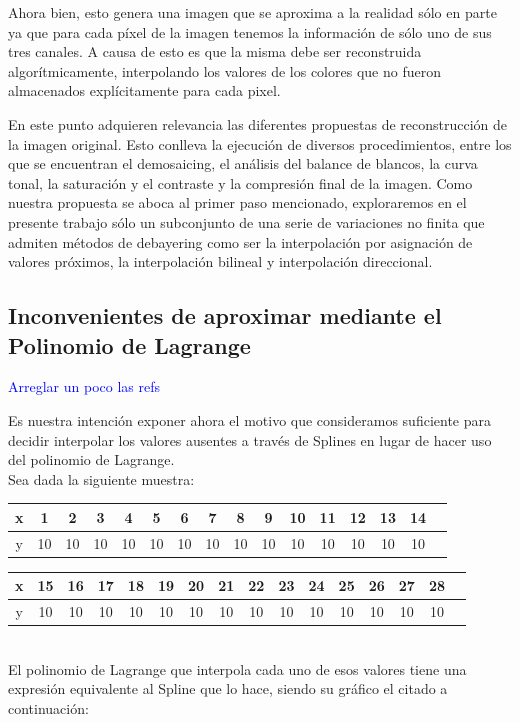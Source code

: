 \documentclass[a4paper]{article}
\begin{document}

Ahora bien, esto genera una imagen que se aproxima a la realidad sólo en parte ya que para cada p\'ixel de la imagen tenemos la informaci\'on de s\'olo uno de sus tres canales. A causa de esto es que la misma debe ser reconstruida algorítmicamente, interpolando los valores de los colores que no fueron almacenados explícitamente para cada pixel.


En este punto adquieren relevancia las diferentes propuestas de reconstrucción de la imagen original. Esto conlleva la ejecución de diversos procedimientos, entre los que se encuentran el demosaicing, el análisis del balance de blancos, la curva tonal, la saturación y el contraste y la compresión final de la imagen. Como nuestra propuesta se aboca al primer paso mencionado, exploraremos en el presente trabajo sólo un subconjunto de una serie de variaciones no finita que admiten métodos de debayering como ser la interpolación por asignación de valores próximos, la interpolación bilineal y interpolación direccional.\\

\newpage
\subsection{Inconvenientes de aproximar mediante el Polinomio de Lagrange}

\textcolor{blue}{Arreglar un poco las refs}

Es nuestra intención exponer ahora el motivo que consideramos suficiente para decidir interpolar los valores ausentes a través de Splines en lugar de hacer uso del polinomio de Lagrange.\\
Sea dada la siguiente muestra: \\
\smallskip


\begin{tabular}{ | c || c | c | c | c | c |c | c | c | c | c | c | c | c | c | c |}
 \hline                 
   x & 1 & 2 & 3 & 4 & 5 & 6 & 7 & 8 & 9 & 10 & 11 & 12 & 13 & 14 \\
 \hline    
y & 10 & 10 & 10& 10& 10& 10& 10& 10& 10& 10& 10& 10& 10& 10 \\
 \hline  
 \end{tabular}

\smallskip

\begin{tabular}{  | c || c | c | c | c | c |c | c | c | c | c | c | c | c | c | c |}
 \hline                 
   x&15& 16 & 17 & 18 & 19 & 20 & 21 & 22 & 23 & 24 & 25 & 26 & 27 & 28\\
 \hline    
y & 10 & 10 & 10& 10& 10& 10& 10& 10& 10& 10& 10& 10& 10& 10 \\
 \hline  
 \end{tabular}
\smallskip
\\
El polinomio de Lagrange que interpola cada uno de esos valores tiene una expresión equivalente al Spline que lo hace, siendo su gráfico el citado a continuación:
\smallskip
\end{document}

